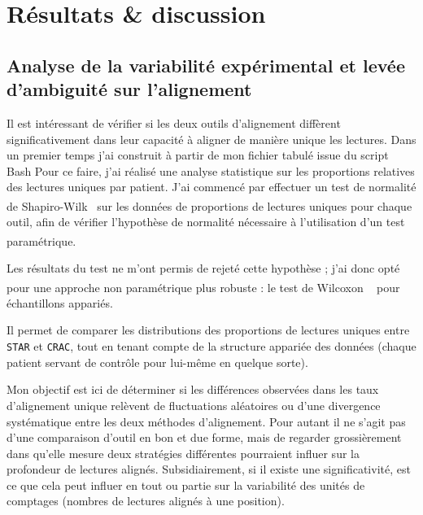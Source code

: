\section{Résultats & discussion}
\subsection{Analyse de la variabilité expérimental et levée d'ambiguité sur l'alignement}
 
Il est intéressant de vérifier  si les deux outils d’alignement diffèrent significativement dans  
leur capacité à aligner de manière unique les lectures. Dans un premier temps j'ai construit à partir de mon fichier tabulé issue du script Bash  Pour ce faire, j’ai réalisé une analyse statistique sur les proportions relatives des lectures uniques par patient.  
J’ai commencé par effectuer un test de normalité de Shapiro-Wilk~\textsuperscript{\cite{shapiro_wilk_1965}} sur les données de proportions de lectures uniques pour chaque outil,  
afin de vérifier l’hypothèse de normalité nécessaire à l’utilisation d’un test paramétrique.~\textsuperscript{\cite{statistical_test_2021}}

Les résultats du test ne m’ont permis de rejeté cette hypothèse ; j’ai donc opté pour une approche non paramétrique plus robuste : le test de Wilcoxon ~\textsuperscript{\cite{wilcoxon_signed_rank_1945}} pour échantillons appariés.  

Il permet de comparer les distributions des proportions de lectures uniques entre \texttt{STAR} et \texttt{CRAC}, tout en tenant compte de la structure appariée des données (chaque patient servant de contrôle pour lui-même en quelque sorte).

Mon objectif est ici de déterminer si les différences observées dans les taux d’alignement unique relèvent de fluctuations aléatoires ou d’une divergence systématique entre les deux méthodes d’alignement. Pour autant il ne s'agit pas d'une comparaison d'outil en bon et due forme, mais de regarder grossièrement dans qu'elle mesure deux stratégies différentes pourraient influer sur la profondeur de lectures alignés. Subsidiairement, si il existe une significativité, est ce que cela peut influer en tout ou partie sur la variabilité des unités de comptages (nombres de lectures alignés à une position). 


